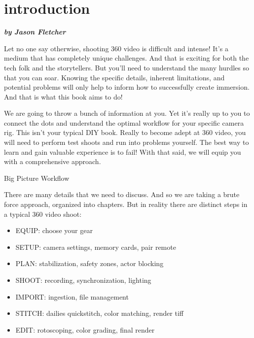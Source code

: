 
\SkipTocEntry\chapter*{introduction}
\addtocounter{section}{2}
\begin{fullwidth}

{\itshape\bfseries by Jason Fletcher

}

Let no one say otherwise, shooting 360 video is difficult and intense! It’s a medium that has completely unique challenges. And that is exciting for both the tech folk and the storytellers. But you’ll need to understand the many hurdles so that you can soar. Knowing the specific details, inherent limitations, and potential problems will only help to inform how to successfully create immersion. And that is what this book aims to do!

We are going to throw a bunch of information at you. Yet it's really up to you to connect the dots and understand the optimal workflow for your specific camera rig. This isn’t your typical DIY book. Really to become adept at 360 video, you will need to perform test shoots and run into problems yourself. The best way to learn and gain valuable experience is to fail! With that said, we will equip you with a comprehensive approach.

{\large Big Picture Workflow\par}

There are many details that we need to discuss. And so we are taking a brute force approach, organized into chapters. But in reality there are distinct steps in a typical 360 video shoot:

\begin{itemize}
\item EQUIP: choose your gear
\item SETUP: camera settings, memory cards, pair remote
\item PLAN: stabilization, safety zones, actor blocking
\item SHOOT: recording, synchronization, lighting
\item IMPORT: ingestion, file management 
\item STITCH: dailies quickstitch, color matching, render tiff
\item EDIT: rotoscoping, color grading, final render
\end{itemize}

\clearpage
\end{fullwidth}
